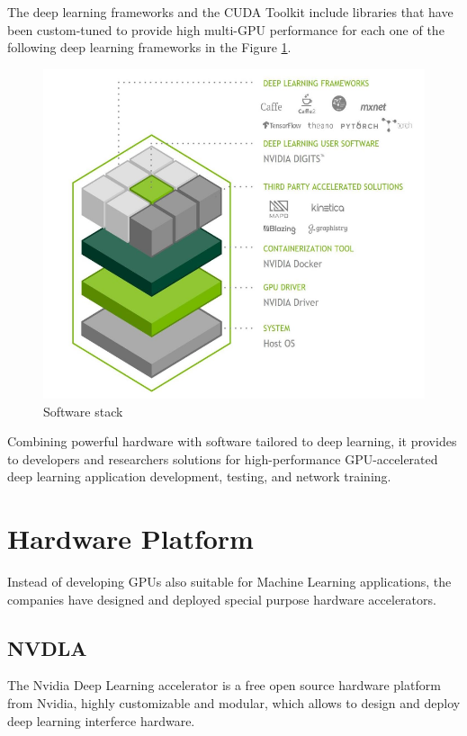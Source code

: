\newpage
The deep learning frameworks and the CUDA Toolkit include libraries that have been custom-tuned to provide high multi-GPU performance for each one of the following deep learning frameworks in the Figure \ref{fig:swtesla}.

\begin{figure}[!htbp] 
\centering
\captionsetup{justification=centering}
  \includegraphics[scale=0.6]{./figure/sw_stack_tesla.PNG}
\caption{Software stack}
  \label{fig:swtesla}
\end{figure} 

Combining powerful hardware with software tailored to deep learning, it provides to developers and researchers solutions for high-performance GPU-accelerated deep learning application development, testing, and network training.
\newpage
\section{Hardware Platform}
Instead of developing GPUs also suitable for Machine Learning applications, the companies have designed and deployed special purpose hardware accelerators.
\subsection{NVDLA} 
The Nvidia Deep Learning accelerator is a free open source hardware platform from Nvidia, highly customizable and modular, which allows to design and deploy deep learning interferce hardware.

